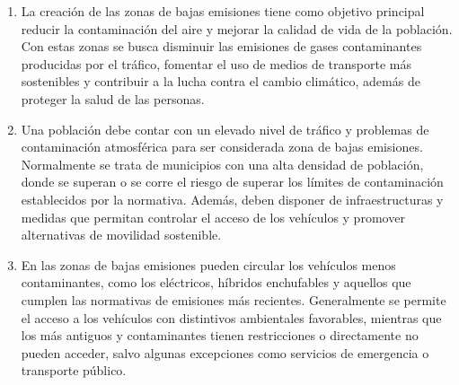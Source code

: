 
  


\begin{solution}
	
\begin{enumerate}[label=\alph*)]
	\item{}
		\vspace{1em}
		La creación de las zonas de bajas emisiones tiene como objetivo principal reducir la contaminación del aire y mejorar la calidad de vida de la población. Con estas zonas se busca disminuir las emisiones de gases contaminantes producidas por el tráfico, fomentar el uso de medios de transporte más sostenibles y contribuir a la lucha contra el cambio climático, además de proteger la salud de las personas.
		\vspace{1em}

	\item{}

		\vspace{1em}
		Una población debe contar con un elevado nivel de tráfico y problemas de contaminación atmosférica para ser considerada zona de bajas emisiones. Normalmente se trata de municipios con una alta densidad de población, donde se superan o se corre el riesgo de superar los límites de contaminación establecidos por la normativa. Además, deben disponer de infraestructuras y medidas que permitan controlar el acceso de los vehículos y promover alternativas de movilidad sostenible.
		\vspace{1em}

	\item{}

		\vspace{1em}
		En las zonas de bajas emisiones pueden circular los vehículos menos contaminantes, como los eléctricos, híbridos enchufables y aquellos que cumplen las normativas de emisiones más recientes. Generalmente se permite el acceso a los vehículos con distintivos ambientales favorables, mientras que los más antiguos y contaminantes tienen restricciones o directamente no pueden acceder, salvo algunas excepciones como servicios de emergencia o transporte público.
		\vspace{1em}

\end{enumerate}

\end{solution}
